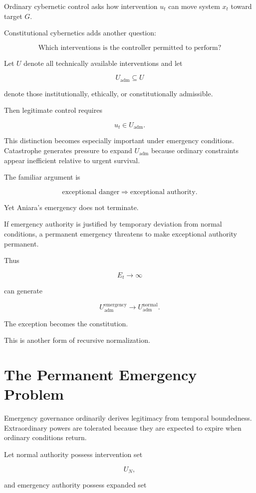 \documentclass[11pt,oneside]{book}
\theoremstyle{definition}
\theoremstyle{remark}
\begin{document}
Ordinary cybernetic control asks how intervention \(u_t\) can move system \(x_t\) toward target \(G\).

Constitutional cybernetics adds another question:

\[
\text{Which interventions is the controller permitted to perform?}
\]

Let \(U\) denote all technically available interventions and let

\[
U_{\mathrm{adm}}\subseteq U
\]

denote those institutionally, ethically, or constitutionally admissible.

Then legitimate control requires

\[
u_t\in U_{\mathrm{adm}}.
\]

This distinction becomes especially important under emergency conditions. Catastrophe generates pressure to expand \(U_{\mathrm{adm}}\) because ordinary constraints appear inefficient relative to urgent survival.

The familiar argument is

\[
\text{exceptional danger}
\Rightarrow
\text{exceptional authority}.
\]

Yet Aniara's emergency does not terminate.

If emergency authority is justified by temporary deviation from normal conditions, a permanent emergency threatens to make exceptional authority permanent.

Thus

\[
E_t\rightarrow\infty
\]

can generate

\[
U_{\mathrm{adm}}^{\mathrm{emergency}}
\rightarrow
U_{\mathrm{adm}}^{\mathrm{normal}}.
\]

The exception becomes the constitution.

This is another form of recursive normalization.

\section{The Permanent Emergency Problem}

Emergency governance ordinarily derives legitimacy from temporal boundedness. Extraordinary powers are tolerated because they are expected to expire when ordinary conditions return.

Let normal authority possess intervention set

\[
U_N,
\]

and emergency authority possess expanded set
\end{document}
